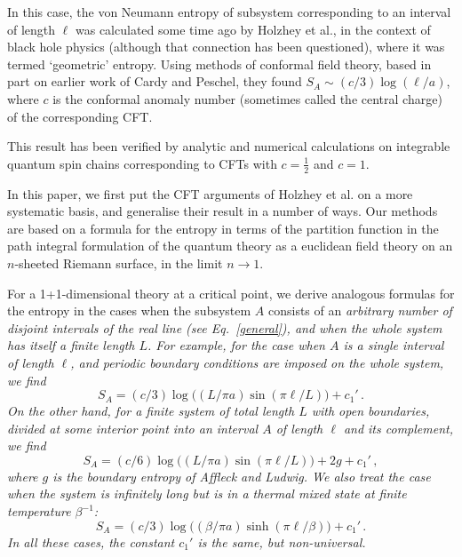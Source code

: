 \documentclass[preprint,aps]{revtex4}
\begin{document}
In this case, the von Neumann entropy of subsystem corresponding to an
interval of length $\ell$ was calculated some time ago by Holzhey et
al.\cite{Holzhey},
in the context of black hole physics (although that connection
has been questioned), where it was termed `geometric' entropy. Using
methods of conformal field theory, based in part on earlier work of
Cardy and Peschel\cite{CardyPeschel}, they found
$S_A\sim (c/3)\log(\ell/a)$, where $c$ is the conformal anomaly number
(sometimes called the central charge) of the corresponding CFT.

This result has been verified by analytic and numerical calculations on
integrable quantum spin chains corresponding to CFTs with $c=\frac12$
and $c=1$. \cite{Vidal,Korepin,leb}

In this paper, we first put the CFT arguments of Holzhey et al.\cite{Holzhey}
on a more
systematic basis, and generalise their result in a number of ways.
Our methods are based on a formula for the entropy in terms of the
partition function in the
path integral formulation of the quantum theory as a euclidean
field theory on an $n$-sheeted Riemann surface, in the limit $n\to1$.

For a 1+1-dimensional theory at a critical point, we derive analogous
formulas for the entropy in the cases when the subsystem $A$ consists
of an \em arbitrary \em number of disjoint intervals of the real line (see
Eq.~\ref{general}), and when the whole system has itself a finite length $L$.
For example, for the case when $A$ is a single interval of length
$\ell$, and periodic boundary conditions are imposed on the whole
system, we find
\begin{equation}
S_A=(c/3)\log\big((L/\pi a)\sin(\pi\ell/L)\big)+c_1'\,.
\end{equation}
On the other hand, for a finite system of total length $L$
with open boundaries, divided at some interior point into an interval
$A$ of length $\ell$ and its complement, we find
\begin{equation}
S_A=(c/6)\log\big((L/\pi a)\sin(\pi\ell/L)\big)+2g+c_1'\,,
\end{equation}
where $g$ is the boundary entropy of Affleck and
Ludwig\cite{AffleckLudwig}.
We also treat the case when the system is infinitely
long but is in a thermal mixed state at finite temperature $\beta^{-1}$:
\begin{equation}
\label{finiteT}
S_A=(c/3)\log\big((\beta/\pi a)\sinh(\pi\ell/\beta)\big)+c_1'\,.
\end{equation}
In all these cases, the constant $c_1'$ is the same, but
non-universal.
\end{document}

